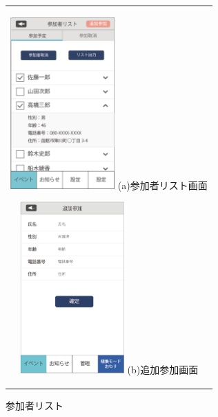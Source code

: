 \begin{figure}[htbp]
  \begin{center}
    \begin{tabular}{c}

      \begin{minipage}{0.33\hsize}
        \begin{center}
\includegraphics[width=4cm]{participant_list}
          \hspace{1cm} %
          {\footnotesize (a)参加者リスト画面}
        \end{center}
      \end{minipage}

      \begin{minipage}{0.33\hsize}
        \begin{center}
\includegraphics[width=4cm]{participant_add.png}
          \hspace{1cm}%
          {\footnotesize (b)追加参加画面}
        \end{center}
      \end{minipage}

    \end{tabular}
    \caption{参加者リスト}
    \label{tab:joinedlist}
  \end{center}
\end{figure}

